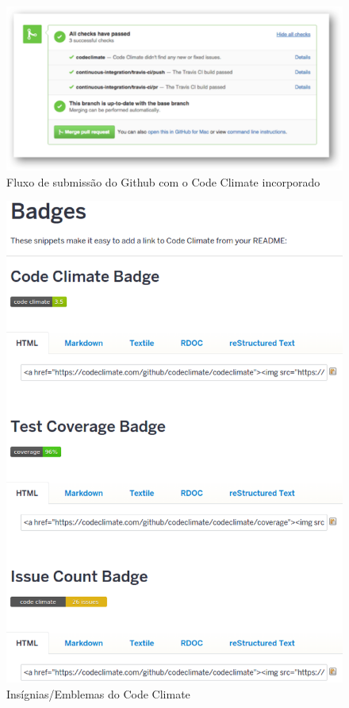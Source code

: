 \begin{figure}[!htb]
	\centering
    \includegraphics[keepaspectratio=true,scale=0.5]
    {figuras/github_workflow_with_codeclimate.eps}
  \caption{Fluxo de submissão do Github com o Code Climate incorporado}
  \label{fig:github_workflow_with_codeclimate}
\end{figure}

\begin{figure}[!htb]
	\centering
    \includegraphics[keepaspectratio=true,scale=0.5]
    {figuras/codeclimate_badges.eps}
  \caption{Insígnias/Emblemas do Code Climate}
  \label{fig:codeclimate_badges}
\end{figure}

